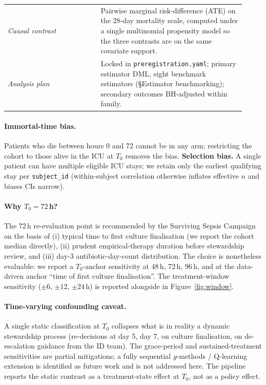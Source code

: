 \documentclass[11pt,a4paper]{article}
\begin{document}
\begin{table}[H]
\begin{tabular}{p{0.36\linewidth}p{0.56\linewidth}}
    \emph{Causal contrast} & Pairwise marginal risk-difference (ATE) on the 28-day mortality scale, computed under a single multinomial propensity model so the three contrasts are on the same covariate support. \\
    \emph{Analysis plan} & Locked in \texttt{preregistration.yaml}; primary estimator DML, eight benchmark estimators (\S Estimator benchmarking); secondary outcomes BH-adjusted within family. \\
    \bottomrule
  \end{tabular}
\end{table}

\paragraph{Immortal-time bias.} Patients who die between hours 0 and 72 cannot be in any arm; restricting the cohort to those alive in the ICU at $T_0$ removes the bias. \textbf{Selection bias.} A single patient can have multiple eligible ICU stays; we retain only the earliest qualifying stay per \texttt{subject\_id} (within-subject correlation otherwise inflates effective $n$ and biases CIs narrow).

\paragraph{Why $T_0 = 72$\,h?} The 72\,h re-evaluation point is recommended by the Surviving Sepsis Campaign \cite{evans2021surviving} on the basis of (i) typical time to first culture finalisation (we report the cohort median directly), (ii) prudent empirical-therapy duration before stewardship review, and (iii) day-3 antibiotic-day-count distribution. The choice is nonetheless evaluable: we report a $T_0$-anchor sensitivity at 48\,h, 72\,h, 96\,h, and at the data-driven anchor ``time of first culture finalisation''. The treatment-window sensitivity ($\pm 6$, $\pm 12$, $\pm 24$\,h) is reported alongside in Figure~\ref{fig:window}.

\paragraph{Time-varying confounding caveat.} A single static classification at $T_0$ collapses what is in reality a dynamic stewardship process (re-decisions at day 5, day 7, on culture finalisation, on de-escalation guidance from the ID team). The grace-period and sustained-treatment sensitivities are partial mitigations; a fully sequential $g$-methods / Q-learning extension is identified as future work and is not addressed here. The pipeline reports the static contrast as a treatment-state effect at $T_0$, not as a policy effect.
\end{document}
